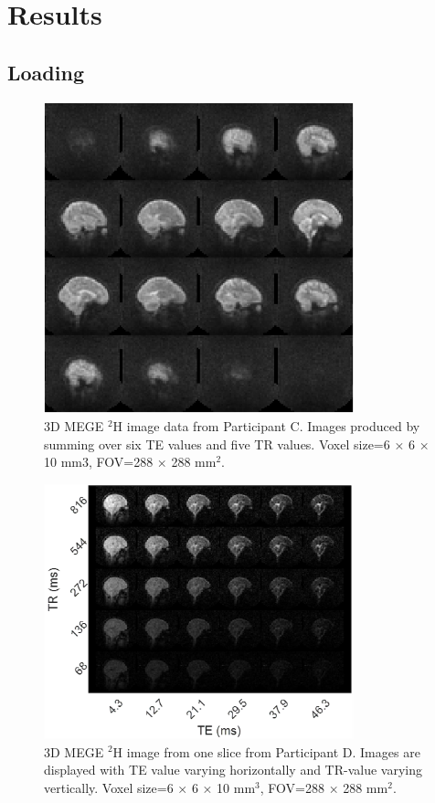 \documentclass[class=article, crop=false]{standalone}
\begin{document}
\section{Results}
\subsection{Loading}

\begin{figure}
    \centering
    \includegraphics[width=0.8\textwidth]{Figures/D2O/Sag_Full.png}
    \caption{3D MEGE $^2$H image data from Participant C. Images produced by summing over six TE values and five TR values. Voxel size=6 × 6 × 10 mm3, FOV=288 × 288 mm$^2$.}
    \label{fig:D2O:Sag_Full}
\end{figure}

\begin{figure}
    \centering
    \includegraphics[width = 0.8\textwidth]{Figures/D2O/TR_TE.png}
    \caption{3D MEGE $^2$H image from one slice from Participant D. Images are displayed with TE value varying horizontally and TR-value varying vertically. Voxel size=6 × 6 × 10 mm$^3$, FOV=288 × 288 mm$^2$.}
    \label{fig:D2O:TR_TE}
\end{figure}
\end{document}
